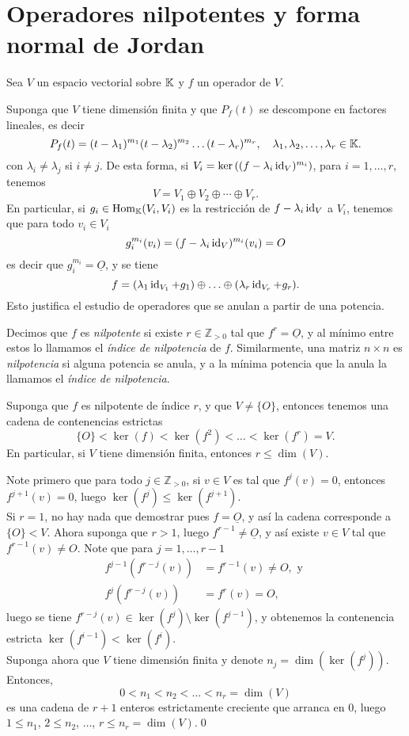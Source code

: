 \section{Operadores nilpotentes y forma normal de Jordan}

Sea $V$ un espacio vectorial sobre $\mathbb{K}$ y $f$ un operador de $V$.

Suponga que $V$ tiene dimensi\'on finita y que $P_f(t)$ se descompone en factores lineales, es decir
\[
P_f(t)=(t-\lambda_1)^{m_1}(t-\lambda_2)^{m_2}\ldots(t-\lambda_r)^{m_r}, \quad \lambda_1,\lambda_2,\ldots,\lambda_r\in \mathbb{K}.
\]
con $\lambda_i\ne\lambda_j$ si $i\ne j$. De esta forma, si $V_i=\ker\left((f-\lambda_i\operatorname{id}_V)^{m_i}\right)$, para $i=1,\ldots,r$, tenemos
\[
V=V_1\oplus V_2\oplus\cdots\oplus V_r.
\]
En particular, si $g_i\in\operatorname{Hom}_{\mathbb{K}}(V_i,V_i)$ es la restricci\'on de $f-\lambda_i\operatorname{id}_V$ a $V_i$, tenemos que para todo $v_i\in V_i$
$$g_i^{m_i}(v_i)=(f-\lambda_i\operatorname{id}_V)^{m_i}(v_i)=O$$
es decir que $g_i^{m_i}=\underline{O}$, y se tiene
$$f=(\lambda_1\operatorname{id}_{V_1}+g_1)\oplus\ldots\oplus(\lambda_r\operatorname{id}_{V_r}+g_r).$$
Esto justifica el estudio de operadores que se anulan a partir de una potencia.

\begin{defn}
Decimos que $f$ es \emph{nilpotente} si existe $r\in\mathbb{Z}_{>0}$ tal que $f^r=\underline{O}$, y al m\'inimo entre estos lo llamamos el \emph{índice de nilpotencia} de $f$. Similarmente, una matriz $n\times n$ es \emph{nilpotencia} si alguna potencia se anula, y a la mínima potencia que la anula la llamamos el \emph{índice de nilpotencia}.
\end{defn}

\begin{prop}\label{contenencia_estricta}
Suponga que $f$ es nilpotente de índice $r$, y que $V\ne\{O\}$, entonces tenemos una cadena de contenencias estrictas
\[
\{O\}<\ker(f)<\ker(f^2)<\ldots<\ker(f^r)=V.
\]
En particular, si $V$ tiene dimensi\'on finita, entonces $r\le\dim(V)$.
\end{prop}

\dem Note primero que para todo $j\in\mathbb{Z}_{>0}$, si $v\in V$ es tal que $f^j(v)=0$, entonces $f^{j+1}(v)=0$, luego $\ker(f^j)\le\ker(f^{j+1})$.\\
Si $r=1$, no hay nada que demostrar pues $f=\underline{O}$, y as\'i la cadena corresponde a $\{O\}<V$. Ahora suponga que $r>1$, luego $f^{r-1}\ne \underline{O}$, y as\'i existe $v\in V$ tal que $f^{r-1}(v)\ne O$. Note que para $j=1,\ldots,r-1$
\begin{align*}
  f^{j-1}\left(f^{r-j}(v)\right) & =f^{r-1}(v)\ne O,\textrm{ y }\\
  f^j\left(f^{r-j}(v)\right) & =f^r(v)=O,
\end{align*}
luego se tiene $f^{r-j}(v)\in \ker(f^j)\setminus \ker(f^{j-1})$, y obtenemos la contenencia estricta $\ker(f^{i-1})<\ker(f^i)$.\\
Suponga ahora que $V$ tiene dimensi\'on finita y denote $n_j=\dim(\ker(f^j))$. Entonces,
\[
0<n_1<n_2<\ldots<n_r=\dim(V)
\]
es una cadena de $r+1$ enteros estrictamente creciente que arranca en $0$, luego $1\le n_1$, $2\le n_2$, $\ldots$, $r\le n_r=\dim(V)$.\qed


